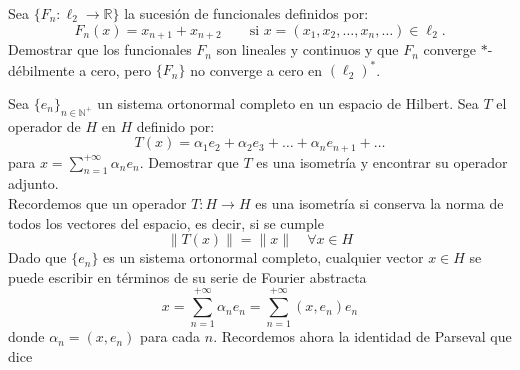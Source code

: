 \begin{ejercicio} %
    Sea $\{F_n : \ell_2 \longrightarrow \mathbb{R}\}$ la sucesión de funcionales definidos por:
    \[ F_n(x) = x_{n+1} + x_{n+2} \qquad \text{si } x = (x_1, x_2, \dots, x_n, \dots) \in \ell_2. \]
    Demostrar que los funcionales $F_n$ son lineales y continuos y que $F_n$ converge $*$-débilmente a cero, pero $\{F_n\}$ no converge a cero en $(\ell_2)^*$.
\end{ejercicio}

\begin{ejercicio} 
    Sea $\{e_n\}_{n \in \mathbb{N}^+}$ un sistema ortonormal completo en un espacio de Hilbert. Sea $T$ el operador de $H$ en $H$ definido por:
    \[ T(x) = \alpha_1 e_2 + \alpha_2 e_3 + \dots + \alpha_n e_{n+1} + \dots \]
    para $x = \sum\limits_{n=1}^{+\infty} \alpha_n e_n$. Demostrar que $T$ es una isometría y encontrar su operador adjunto. \\

    \noindent
    Recordemos que un operador $T: H \longrightarrow H$ es una isometría si conserva la norma de todos los vectores del espacio, es decir, si se cumple
    \begin{equation*}
        \|T(x)\| = \|x\| \quad \forall x \in H
    \end{equation*}
    Dado que $\{e_n\}$ es un sistema ortonormal completo, cualquier vector $x \in H$ se puede escribir en términos de su serie de Fourier abstracta
    $$x = \sum_{n=1}^{+\infty} \alpha_n e_n=\sum_{n=1}^{+\infty} (x,e_n) e_n$$
    donde $\alpha_n = ( x, e_n )$ para cada $n$. Recordemos ahora la identidad de Parseval que dice


\end{ejercicio}

